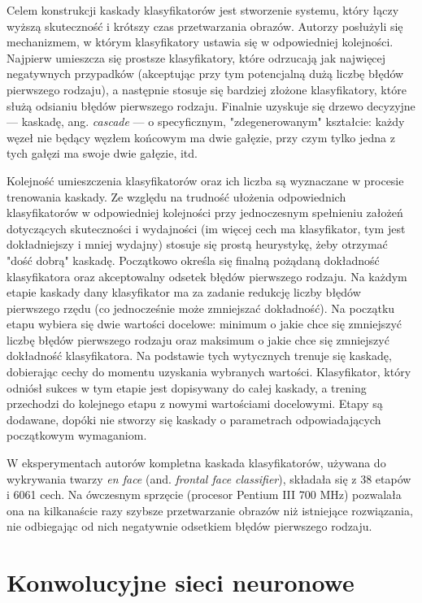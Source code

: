 \documentclass[12pt,a4paper,leqno,oneside,titlepage]{book}
\begin{document}
Celem konstrukcji kaskady klasyfikatorów jest stworzenie systemu, który łączy wyższą skuteczność i krótszy czas przetwarzania obrazów. Autorzy posłużyli się mechanizmem, w którym klasyfikatory ustawia się w odpowiedniej kolejności. Najpierw umieszcza się prostsze klasyfikatory, które odrzucają jak najwięcej negatywnych przypadków (akceptując przy tym potencjalną dużą liczbę błędów pierwszego rodzaju), a następnie stosuje się bardziej złożone klasyfikatory, które służą odsianiu błędów pierwszego rodzaju. Finalnie uzyskuje się drzewo decyzyjne — kaskadę, ang. \textit{cascade} — o specyficznym, "zdegenerowanym" kształcie: każdy węzeł nie będący węzłem końcowym ma dwie gałęzie, przy czym tylko jedna z tych gałęzi ma swoje dwie gałęzie, itd.

Kolejność umieszczenia klasyfikatorów oraz ich liczba są wyznaczane w procesie trenowania kaskady. Ze względu na trudność ułożenia odpowiednich klasyfikatorów w odpowiedniej kolejności przy jednoczesnym spełnieniu założeń dotyczących skuteczności i wydajności (im więcej cech ma klasyfikator, tym jest dokładniejszy i mniej wydajny) stosuje się prostą heurystykę, żeby otrzymać "dość dobrą" kaskadę. Początkowo określa się finalną pożądaną dokładność klasyfikatora oraz akceptowalny odsetek błędów pierwszego rodzaju. Na każdym etapie kaskady dany klasyfikator ma za zadanie redukcję liczby błędów pierwszego rzędu (co jednocześnie może zmniejszać dokładność). Na początku etapu wybiera się dwie wartości docelowe: minimum o jakie chce się zmniejszyć liczbę błędów pierwszego rodzaju oraz maksimum o jakie chce się zmniejszyć dokładność klasyfikatora. Na podstawie tych wytycznych trenuje się kaskadę, dobierając cechy do momentu uzyskania wybranych wartości. Klasyfikator, który odniósł sukces w tym etapie jest dopisywany do całej kaskady, a trening przechodzi do kolejnego etapu z nowymi wartościami docelowymi. Etapy są dodawane, dopóki nie stworzy się kaskady o parametrach odpowiadających początkowym wymaganiom.

W eksperymentach autorów kompletna kaskada klasyfikatorów, używana do wykrywania twarzy \textit{en face} (and. \textit{frontal face classifier}), składała się z 38 etapów i 6061 cech. Na ówczesnym sprzęcie (procesor Pentium III 700 MHz) pozwalała ona na kilkanaście razy szybsze przetwarzanie obrazów niż istniejące rozwiązania, nie odbiegając od nich negatywnie odsetkiem błędów pierwszego rodzaju.\cite{ViolaJones01}

%
%
%
%
%
%
%
%
%
%
%

\section{Konwolucyjne sieci neuronowe}
\end{document}
